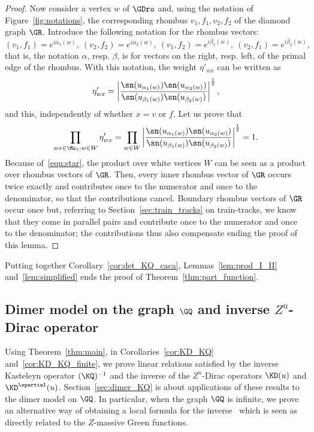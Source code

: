 \documentclass[a4paper,twoside,11pt]{article}
\begin{document}
\begin{proof}
Now consider a vertex $w$ of $\GDro$ and, using the notation of Figure~\ref{fig:notations}, the corresponding rhombus $v_1,f_1,v_2,f_2$
of the diamond graph $\GR$. Introduce the following notation for the rhombus vectors:
\begin{equation}\label{equ:star}
(v_1,f_1)=e^{i\bar{\alpha}_1(w)},\ (v_2,f_2)=e^{i\bar{\alpha}_2(w)},\ (v_1,f_2)=e^{i\bar{\beta}_1(w)},\ (v_2,f_1)=e^{i\bar{\beta}_2(w)},
\end{equation}
that is, the notation $\alpha$, resp. $\beta$, is for vectors on the right, resp. left, of the primal edge of the rhombus.
With this notation, the weight $\eta'_{wx}$ can be written as
\[
\eta'_{wx}=\left|\frac{\sn(u_{\alpha_1(w)})\sn(u_{\alpha_2(w)})}{\sn(u_{\beta_1(w)})\sn(u_{\beta_2(w)})}\right|^{\frac{1}{2}},
\]
and this, independently of whether $x=v$ or $f$. Let us prove that
\[
\prod_{wx\in\Ms_1:w\in W}\eta'_{wx}=
\prod_{w\in W}\left|\frac{\sn(u_{\alpha_1(w)})\sn(u_{\alpha_2(w)})}{\sn(u_{\beta_1(w)})\sn(u_{\beta_2(w)})}\right|^{\frac{1}{2}}=1.
\]
Because of~\eqref{equ:star}, the product over white vertices $W$ can be seen as a product over rhombus vectors of $\GR$. 
Then, every inner 
rhombus vector of $\GR$ occurs twice exactly and contributes once to the numerator and once to the denominator, so that the contributions cancel.
Boundary rhombus vectors of $\GR$ occur once but, referring to Section~\ref{sec:train_tracks} on train-tracks, we know that they come in parallel pairs and contribute
once to the numerator and once to the denominator; the contributions thus also compensate ending the proof of this lemma.
\end{proof}
Putting together Corollary~\ref{cor:det_KQ_caca}, Lemmas~\ref{lem:prod_I_II} and~\ref{lem:simplified} ends the proof of Theorem~\ref{thm:part_function}.






\subsection{Dimer model on the graph $\GQ$ and inverse $Z^u$-Dirac operator}\label{sec:inv_KQ_KD}

Using Theorem~\ref{thm:main}, in Corollaries~\ref{cor:KD_KQ} and~\ref{cor:KD_KQ_finite}, we prove linear relations satisfied by 
the inverse Kasteleyn operator $(\KQ)^{-1}$ and the inverse of the $Z^u$-Dirac operators $\KD(u)$ and $\KD^\spartial(u)$. 
Section~\ref{sec:dimer_KQ} is about applications
of these results to the dimer model on $\GQ$. In particular, when the graph $\GQ$ is infinite, we prove an alternative way 
of obtaining a local formula for the inverse~\cite{BdtR2} which is seen as directly related to the $Z$-massive Green functions.
\end{document}
